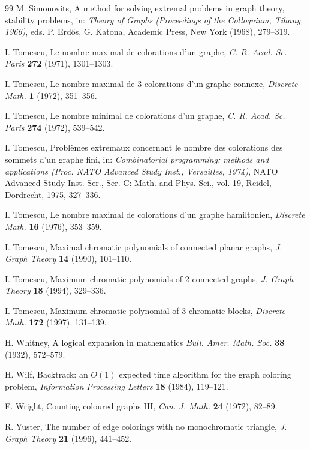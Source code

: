 \documentclass[11pt]{article}
\begin{document}
\begin{thebibliography}{99}
 M. Simonovits, A method for solving extremal
  problems in graph theory, stability problems, in: \emph{Theory of
    Graphs (Proceedings of the Colloquium, Tihany, 1966)},
  eds. P. Erd\H{o}s, G. Katona, Academic Press, New York (1968),
  279--319.


 I. Tomescu, Le nombre maximal de colorations
  d'un graphe, \emph{C. R. Acad. Sc. Paris} \textbf{272} (1971),
  1301--1303.

 I. Tomescu, Le nombre maximal de
  3-colorations d'un graphe connexe, \emph{Discrete Math.} \textbf{1}
  (1972), 351--356.

 I. Tomescu, Le nombre minimal de colorations
  d'un graphe, \emph{C. R. Acad. Sc. Paris} \textbf{274} (1972),
  539--542.

 I. Tomescu, Probl\`emes extremaux concernant le
  nombre des colorations des sommets d'un graphe fini, in:
  \emph{Combinatorial programming: methods and applications
    (Proc. NATO Advanced Study Inst., Versailles, 1974)}, NATO
  Advanced Study Inst. Ser., Ser. C: Math. and Phys. Sci., vol. 19,
  Reidel, Dordrecht, 1975, 327--336.

 I. Tomescu, Le nombre maximal de
  colorations d'un graphe hamiltonien, \emph{Discrete Math.}
  \textbf{16} (1976), 353--359.

 I. Tomescu, Maximal chromatic
  polynomials of connected planar graphs, \emph{J. Graph Theory}
  \textbf{14} (1990), 101--110.

 I. Tomescu, Maximum chromatic polynomials of
  2-connected graphs, \emph{J. Graph Theory} \textbf{18} (1994),
  329--336.

 I. Tomescu, Maximum chromatic polynomial of
  3-chromatic blocks, \emph{Discrete Math.} \textbf{172} (1997),
  131--139.

 H. Whitney, A logical expansion in mathematics
  \emph{Bull. Amer. Math. Soc.} \textbf{38} (1932), 572--579.

 H. Wilf, Backtrack: an $O(1)$ expected time algorithm
  for the graph coloring problem, \emph{Information Processing
    Letters} \textbf{18} (1984), 119--121.

 E. Wright, Counting coloured graphs III,
  \emph{Can. J. Math.} \textbf{24} (1972), 82--89.

 R. Yuster, The number of edge colorings with no
  monochromatic triangle, \emph{J. Graph Theory} \textbf{21} (1996),
  441--452.

\end{thebibliography}
\end{document}
